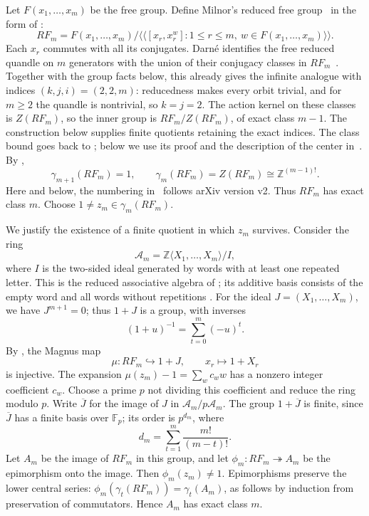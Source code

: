\documentclass[11pt,a4paper]{article}
\theoremstyle{definition}
\theoremstyle{remark}
\newcommand{\Z}{\mathbb Z}
\newcommand{\F}{\mathbb F}
\begin{document}
Let \(F(x_1,\ldots,x_m)\) be the free group.
Define Milnor's reduced free group~\cite{Milnor}
in the form of \cite[Definition~1.2]{Darne}:
\[
 RF_m=F(x_1,\ldots,x_m)/
 \langle\!\langle [x_r,x_r^w]:
 1\le r\le m,\ w\in F(x_1,\ldots,x_m)\rangle\!\rangle.
\]
Each \(x_r\) commutes with all its conjugates.
Darné identifies the free reduced quandle on \(m\) generators with the union
of their conjugacy classes in \(RF_m\)~\cite[Proposition~7.10]{DarneNilpotent}.
Together with the group facts below, this already gives the infinite analogue
with indices \((k,j,i)=(2,2,m)\): reducedness makes every orbit trivial,
and for \(m\ge2\) the quandle is nontrivial, so \(k=j=2\). The action kernel
on these classes is \(Z(RF_m)\), so the inner group is \(RF_m/Z(RF_m)\),
of exact class \(m-1\).
The construction below supplies finite quotients retaining the exact indices.
The class bound goes back to \cite[Lemma~1.3]{HabeggerLin};
below we use its proof and the description of the center in~\cite{Darne}.
By \cite[Propositions~1.3 and~1.18]{Darne},
\[
 \gamma_{m+1}(RF_m)=1,\qquad
 \gamma_m(RF_m)=Z(RF_m)\cong\Z^{(m-1)!}.
\]
Here and below, the numbering in~\cite{Darne} follows arXiv version v2.
Thus \(RF_m\) has exact class \(m\).
Choose \(1\ne z_m\in\gamma_m(RF_m)\).

We justify the existence of a finite quotient in which \(z_m\) survives.
Consider the ring
\[
 \mathscr A_m=\Z\langle X_1,\ldots,X_m\rangle/I,
\]
where \(I\) is the two-sided ideal generated by words
with at least one repeated letter. This is the reduced associative
algebra of \cite[Definition~1.4]{Darne}; its additive basis consists
of the empty word and all words without repetitions \cite[Fact~1.5]{Darne}.
For the ideal \(J=(X_1,\ldots,X_m)\), we have \(J^{m+1}=0\);
thus \(1+J\) is a group, with inverses
\[
 (1+u)^{-1}=\sum_{t=0}^{m}(-u)^t.
\]
By \cite[Corollary~1.13]{Darne}, the Magnus map
\[
 \mu:RF_m\hookrightarrow1+J,\qquad x_r\mapsto1+X_r
\]
is injective.
The expansion \(\mu(z_m)-1=\sum_w c_ww\)
has a nonzero integer coefficient \(c_w\).
Choose a prime \(p\) not dividing this coefficient
and reduce the ring modulo \(p\).
Write \(\overline J\) for the image of \(J\)
in \(\mathscr A_m/p\mathscr A_m\).
The group \(1+\overline J\) is finite, since \(\overline J\)
has a finite basis over \(\F_p\); its order is \(p^{d_m}\), where
\[
 d_m=\sum_{t=1}^{m}\frac{m!}{(m-t)!}.
\]
Let \(A_m\) be the image of \(RF_m\) in this group,
and let \(\phi_m:RF_m\twoheadrightarrow A_m\) be the epimorphism onto the image.
Then \(\phi_m(z_m)\ne1\).
Epimorphisms preserve the lower central series:
\(\phi_m(\gamma_t(RF_m))=\gamma_t(A_m)\),
as follows by induction from preservation of commutators.
Hence \(A_m\) has exact class \(m\).
\end{document}
